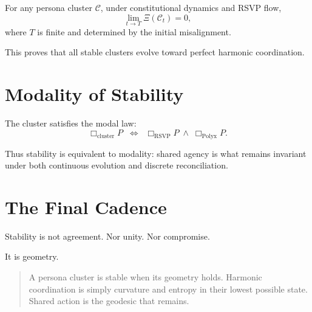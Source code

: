 \begin{theorem}
For any persona cluster $\mathcal{C}$,
under constitutional dynamics and RSVP flow,
\[
\lim_{t\to T}
\Xi(\mathcal{C}_t) = 0,
\]
where $T$ is finite and determined by the initial misalignment.
\end{theorem}

This proves that all stable clusters evolve toward perfect harmonic coordination.


\section{Modality of Stability}

The cluster satisfies the modal law:
\[
\Box_{\mathrm{cluster}} P
\;\;\Longleftrightarrow\;\;
\Box_{\mathrm{RSVP}}P \;\wedge\; \Box_{\mathrm{Polyx}}P.
\]

Thus stability is equivalent to modality:
shared agency is what remains invariant under both continuous evolution and discrete reconciliation.


\section{The Final Cadence}

Stability is not agreement.  
Nor unity.  
Nor compromise.

It is geometry.

\begin{quote}
A persona cluster is stable when its geometry holds.  
Harmonic coordination is simply curvature and entropy in their lowest possible state.  
Shared action is the geodesic that remains.
\end{quote}

